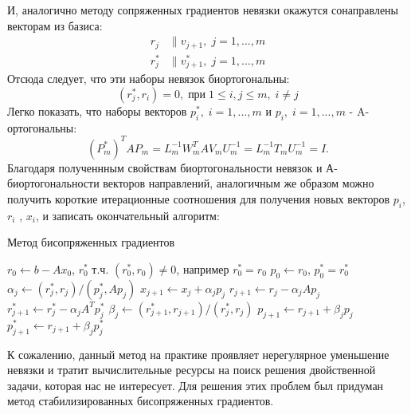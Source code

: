 И, аналогично методу сопряженных градиентов невязки окажутся сонаправлены векторам из базиса:
\begin{align*}
    r_j &\parallel v_{j+1},\;j=1,...,m \\
    r_j^* &\parallel v_{j+1}^*,\;j=1,...,m
\end{align*}
Отсюда следует, что эти наборы невязок биортогональны:
\begin{equation}
    \label{eq:rjrieq0}
    (r_j^*,r_i) = 0,\;\text{при}\;1 \leq i,j \leq m,\;i \neq j
\end{equation}
Легко показать, что наборы векторов $p_i^*,\;i=1,...,m$ и $p_i,\;i=1,...,m$ - A-ортогональны:
\begin{equation*}
    (P_m^*)^T A P_m = L_m^{-1} W_m^T A V_m U_m^{-1} = L_m^{-1} T_m U_m^{-1} = I.
\end{equation*}
Благодаря полученнным свойствам биортогональности невязок и А-биортогональности
векторов направлений, аналогичным же образом можно получить короткие итерационные соотношения для получения новых векторов 
$p_i$, $r_i$ , $x_i$, и записать окончательный алгоритм:
\begin{algorithm}
    \caption{Метод бисопряженных градиентов}
    \begin{algorithmic}[1]
    \State $r_0 \gets b - A x_0$, $r_0^*$ т.ч. $(r_0^*,r_0) \neq 0$, например $r_0^*=r_0$ 
    \State $p_0 \gets r_0$, $p_0^*=r_0^*$
        \State $\alpha_j \gets (r_j^*, r_j) / (p_j^*, A p_j)$
        \State $x_{j+1} \gets x_j + \alpha_j p_j$
        \State $r_{j+1} \gets r_j - \alpha_j A p_j$
        \State $r_{j+1}^* \gets r_j^* - \alpha_j A^T p_j^*$
        \State $\beta_j \gets (r_{j+1}^*, r_{j+1}) / (r_j^*, r_j)$
        \State $p_{j+1} \gets r_{j+1} + \beta_j p_j$
        \State $p_{j+1}^* \gets r_{j+1} + \beta_j p_j^*$
    \EndFor
    \end{algorithmic}
\end{algorithm}
К сожалению, данный метод на практике проявляет нерегулярное уменьшение невязки и 
тратит вычислительные ресурсы на поиск решения двойственной задачи, которая нас не интересует.
Для решения этих проблем был придуман метод стабилизированных бисопряженных градиентов.

